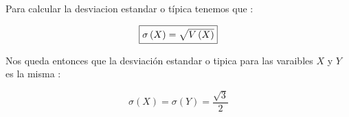 \documentclass[12pt]{article}
\begin{document}
\begin{flushleft}
    Para calcular la desviacion estandar o t\'ipica tenemos que :
\end{flushleft}

\begin{equation*}
    \fbox{$\sigma \left(X\right) = \sqrt{V\left(X\right)} $}
\end{equation*}

\begin{flushleft}
    Nos queda entonces que la desviaci\'on estandar o tipica para las varaibles $X$ y $Y$
    es la misma :
\end{flushleft}

\begin{equation*}
    \displaystyle \sigma \left(X \right) = \sigma\left(Y\right)  = \frac{\sqrt{3}}{2}
\end{equation*}
\end{document}
